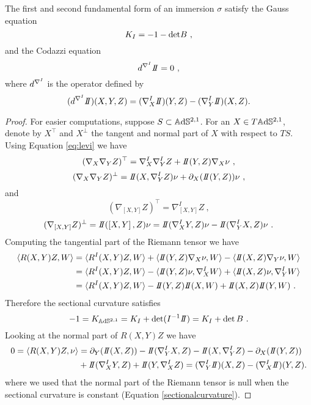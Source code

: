 \begin{theorem}
    The first and second fundamental form of an immersion $\sigma$ satisfy the Gauss equation   
    \[
        K_I = -1 - \text{det}B \ ,
    \]
    and the Codazzi equation
    \[
        d^{\nabla^\I}\II=0 \ ,
    \]
    where $d^{\nabla^I}$ is the operator defined by
    \[
        (d^{\nabla^\I}\II)(X,Y,Z) = (\nabla^\I_X \II)(Y,Z) - (\nabla^\I_Y \II)(X,Z) .
    \]
\end{theorem}
\begin{proof}
    For easier computations, suppose $S \subset \mathbb{A}\mathrm{d}\mathbb{S}^{2,1}$. For an $X\in T\mathbb{A}\mathrm{d}\mathbb{S}^{2,1}$, denote by $X^\top$ and $X^\perp$ the tangent and normal part of $X$ with respect to $TS$. Using Equation \ref{eq:levi} we have
    \[
        (\nabla_X \nabla_Y Z)^\top = \nabla^I_X \nabla^I_Y Z + \II(Y,Z) \nabla_X \nu \ ,
    \] 
    \[
        (\nabla_X \nabla_Y Z)^\perp = \II(X, \nabla^I_Y Z) \nu + \partial_X (\II (Y,Z)) \nu \ ,
    \] 
    and
    \[
        (\nabla_{\left[ X,Y \right]} Z)^\top = \nabla^I_{\left[ X,Y \right]} Z \ ,
    \]
    \[
        (\nabla_{\left[ X,Y \right]} Z)^\perp = \II(\left[ X,Y \right], Z) \nu = \II(\nabla^I_X Y,Z) \nu - \II(\nabla^I_Y X,Z)\nu \ .
    \]
    Computing the tangential part of the Riemann tensor we have
    \[
    \begin{split}
        \langle R(X,Y)Z,W \rangle & = \langle R^I(X,Y)Z,W \rangle + \langle \II(Y,Z) \nabla_X \nu,  W \rangle - \langle \II(X,Z) \nabla_Y \nu, W \rangle \\
        & = \langle R^I(X,Y)Z,W \rangle - \langle \II(Y,Z) \nu, \nabla^I_X W \rangle + \langle \II(X,Z) \nu, \nabla^I_Y W \rangle \\
        & = \langle R^I(X,Y)Z,W \rangle - \II(Y,Z) \II(X,W) + \II(X,Z) \II(Y,W) \ .
    \end{split}
    \]
    Therefore the sectional curvature satisfies
    \[
        -1 = K_{\A^{2,1}} = K_I + \det(\I^{-1}\II) = K_I + \det B \ .
    \]
    Looking at the normal part of $R(X,Y)Z$ we have
    \[
    \begin{split}
        0 = \langle R(X,Y)Z,\nu \rangle & = 
        \partial_Y (\II (X,Z)) -\II(\nabla^I_Y X,Z) -\II(X, \nabla^I_Y Z) -\partial_X (\II (Y,Z)) \\ 
        & + \II(\nabla^I_X Y,Z)+\II(Y, \nabla^I_X Z) = (\nabla^I_Y \II)(X,Z) - (\nabla^I_X \II)(Y,Z).
    \end{split}
    \]
    where we used that the normal part of the Riemann tensor is null when the sectional curvature is constant (Equation \ref{sectionalcurvature}).
\end{proof}

